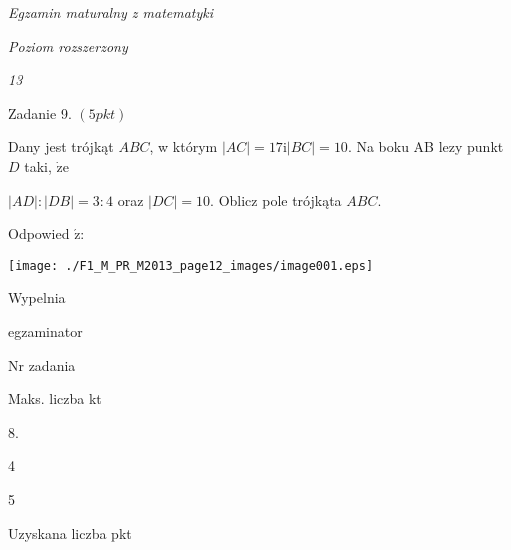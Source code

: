 \documentclass[a4paper,12pt]{article}
\begin{document}
{\it Egzamin maturalny z matematyki}

{\it Poziom rozszerzony}

{\it 13}

Zadanie 9. $(5pkt)$

Dany jest trójkąt $ABC$, w którym $|AC|=17 \mathrm{i} |BC|=10$. Na boku AB lezy punkt $D$ taki, $\dot{\mathrm{z}}\mathrm{e}$

$|AD|:|DB|=3:4$ oraz $|DC|=10$. Oblicz pole trójkąta $ABC.$

Odpowied $\acute{\mathrm{z}}$:
\begin{center}
\texttt{[image: ./F1\_M\_PR\_M2013\_page12\_images/image001.eps]}
\end{center}
Wypelnia

egzaminator

Nr zadania

Maks. liczba kt

8.

4

5

Uzyskana liczba pkt
\end{document}
